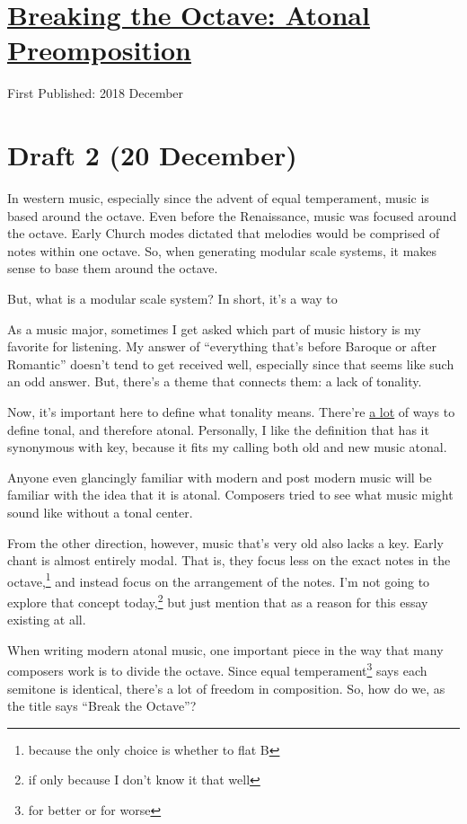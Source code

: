 \documentclass[12pt]{article}[titlepage]
\newcommand{\say}[1]{``#1''}
\newcommand{\1}{\={a}}
\newcommand{\2}{\={e}}
\newcommand{\3}{\={\i}}
\newcommand{\4}{\=o}
\newcommand{\5}{\=u}
\newcommand{\6}{\={A}}
\renewcommand{\,}{\textsuperscript{,}}
\begin{document}
\doublespacing
\section{\href{atonal-precomposition.html}{Breaking the Octave: Atonal Preomposition}}
First Published: 2018 December
\section{Draft 2 (20 December)}
In western music, especially since the advent of equal temperament, music is based around the octave.
Even before the Renaissance, music was focused around the octave.
Early Church modes dictated that melodies would be comprised of notes within one octave.
So, when generating modular scale systems, it makes sense to base them around the octave.

But, what is a modular scale system?
In short, it's a way to 



As a music major, sometimes I get asked which part of music history is my favorite for listening.
My answer of \say{everything that's before Baroque or after Romantic} doesn't tend to get received well, especially since that seems like such an odd answer.
But, there's a theme that connects them: a lack of tonality.

Now, it's important here to define what tonality means.
There're \href{https://en.wikipedia.org/wiki/Tonality}{a lot} of ways to define tonal, and therefore atonal.
Personally, I like the definition that has it synonymous with key, because it fits my calling both old and new music atonal.

Anyone even glancingly familiar with modern and post modern music will be familiar with the idea that it is atonal.
Composers tried to see what music might sound like without a tonal center.

From the other direction, however, music that's very old also lacks a key.
Early chant is almost entirely modal.
That is, they focus less on the exact notes in the octave,\footnote{because the only choice is whether to flat B} and instead focus on the arrangement of the notes.
I'm not going to explore that concept today,\footnote{if only because I don't know it that well} but just mention that as a reason for this essay existing at all.

When writing modern atonal music, one important piece in the way that many composers work is to divide the octave.
Since equal temperament\footnote{for better or for worse} says each semitone is identical, there's a lot of freedom in composition.
So, how do we, as the title says \say{Break the Octave}?
\end{document}
